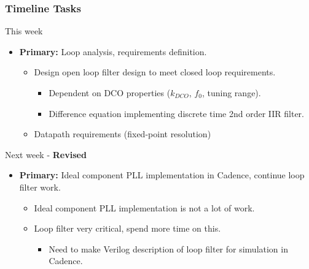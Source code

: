 \documentclass[t, screen, aspectratio=43]{beamer}
\begin{document}
\begin{frame}
	\frametitle{Timeline Tasks}
	\begin{block}{This week}
		\begin{itemize}
			\footnotesize
			\item \textbf{Primary:} Loop analysis, requirements definition.
			\begin{itemize}
				\footnotesize
				\item Design open loop filter design to meet closed loop requirements.
				\begin{itemize}
					\item Dependent on DCO properties ($k_{DCO}$, $f_0$, tuning range).
					\item Difference equation implementing discrete time 2nd order IIR filter.
				\end{itemize} 
				\item Datapath requirements (fixed-point resolution)
			\end{itemize} 
		\end{itemize}    
	\end{block}
	\begin{block}{Next week - \color{red} \textbf{Revised}}
		\begin{itemize}
			\footnotesize
			\item \textbf{Primary:} Ideal component PLL implementation in Cadence, \color{red} continue loop filter work.
			\begin{itemize}
				\footnotesize
				\item Ideal component PLL implementation is not a lot of work.
				\item Loop filter very critical, spend more time on this.
				\begin{itemize}
					\footnotesize
					\item Need to make Verilog description of loop filter for simulation in Cadence.
				\end{itemize}
			\end{itemize} 
		\end{itemize}    
	\end{block}
\end{frame}

\end{document}
